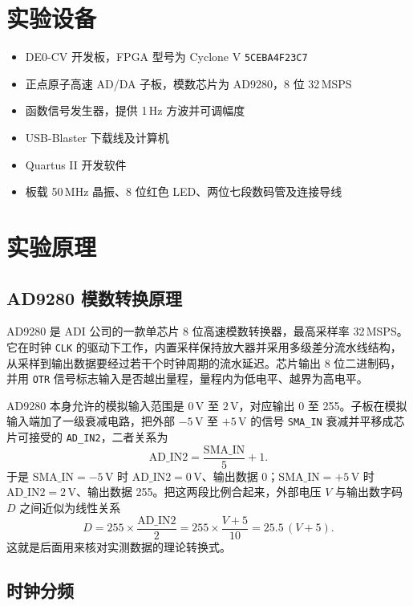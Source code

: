 \documentclass{ctexrep}
\begin{document}
\section{实验设备}

\begin{itemize}
    \item DE0-CV 开发板，FPGA 型号为 Cyclone V \texttt{5CEBA4F23C7}
    \item 正点原子高速 AD/DA 子板，模数芯片为 AD9280，8 位 32\,MSPS
    \item 函数信号发生器，提供 1\,Hz 方波并可调幅度
    \item USB-Blaster 下载线及计算机
    \item Quartus II 开发软件
    \item 板载 50\,MHz 晶振、8 位红色 LED、两位七段数码管及连接导线
\end{itemize}

\section{实验原理}

\subsection{AD9280 模数转换原理}

AD9280 是 ADI 公司的一款单芯片 8 位高速模数转换器，最高采样率 32\,MSPS。它在时钟 \texttt{CLK} 的驱动下工作，内置采样保持放大器并采用多级差分流水线结构，从采样到输出数据要经过若干个时钟周期的流水延迟。芯片输出 8 位二进制码，并用 \texttt{OTR} 信号标志输入是否越出量程，量程内为低电平、越界为高电平。

AD9280 本身允许的模拟输入范围是 $0\,$V 至 $2\,$V，对应输出 0 至 255。子板在模拟输入端加了一级衰减电路，把外部 $-5\,$V 至 $+5\,$V 的信号 \texttt{SMA\_IN} 衰减并平移成芯片可接受的 \texttt{AD\_IN2}，二者关系为
\[
    \mathrm{AD\_IN2} = \frac{\mathrm{SMA\_IN}}{5} + 1 .
\]
于是 $\mathrm{SMA\_IN} = -5\,$V 时 $\mathrm{AD\_IN2} = 0\,$V、输出数据 0；$\mathrm{SMA\_IN} = +5\,$V 时 $\mathrm{AD\_IN2} = 2\,$V、输出数据 255。把这两段比例合起来，外部电压 $V$ 与输出数字码 $D$ 之间近似为线性关系
\[
    D = 255 \times \frac{\mathrm{AD\_IN2}}{2}
      = 255 \times \frac{V + 5}{10}
      = 25.5\,(V + 5).
\]
这就是后面用来核对实测数据的理论转换式。

\subsection{时钟分频}
\end{document}
